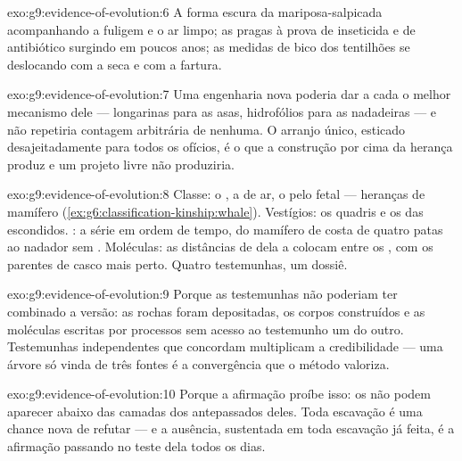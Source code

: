 \begin{solution}{exo:g9:evidence-of-evolution:6}
A forma escura da mariposa-salpicada acompanhando a fuligem e
o ar limpo; as pragas à prova de inseticida e de antibiótico
surgindo em poucos anos; as medidas de bico dos tentilhões se
deslocando com a seca e com a fartura.
\end{solution}

\begin{solution}{exo:g9:evidence-of-evolution:7}
Uma engenharia nova poderia dar a cada  o melhor
mecanismo dele --- longarinas para as asas, hidrofólios para
as nadadeiras --- e não repetiria contagem arbitrária de
 nenhuma. O arranjo único, esticado desajeitadamente
para todos os ofícios, é o que a construção por cima da
herança produz e um projeto livre não produziria.
\end{solution}

\begin{solution}{exo:g9:evidence-of-evolution:8}
Classe: o , a  de ar, o pelo fetal --- heranças
de mamífero (\cref{ex:g6:classification-kinship:whale}).
Vestígios: os quadris e os  das  escondidos.
: a série em ordem de tempo, do mamífero de costa de
quatro patas ao nadador sem . Moléculas: as distâncias
de  dela a colocam entre os , com os parentes
de casco mais perto. Quatro testemunhas, um dossiê.
\end{solution}

\begin{solution}{exo:g9:evidence-of-evolution:9}
Porque as testemunhas não poderiam ter combinado a versão: as
rochas foram depositadas, os corpos construídos e as
moléculas escritas por processos sem acesso ao testemunho um
do outro. Testemunhas independentes que concordam multiplicam
a credibilidade --- uma árvore só vinda de três fontes é a
convergência que o método valoriza.
\end{solution}

\begin{solution}{exo:g9:evidence-of-evolution:10}
Porque a afirmação proíbe isso: os  não podem
aparecer abaixo das camadas dos antepassados deles. Toda
escavação é uma chance nova de refutar --- e a ausência,
sustentada em toda escavação já feita, é a afirmação passando
no teste dela todos os dias.
\end{solution}

